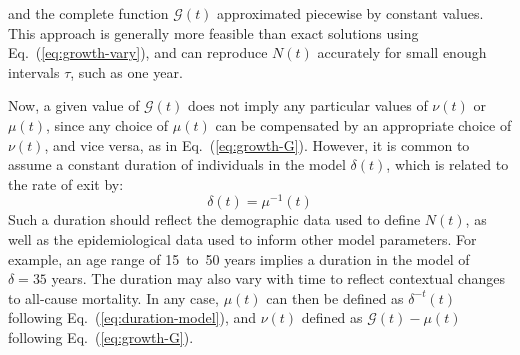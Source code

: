 and the complete function $\mathcal{G}(t)$ approximated piecewise by constant values.
This approach is generally more feasible than exact solutions using Eq.~(\ref{eq:growth-vary}),
and can reproduce $N(t)$ accurately for small enough intervals $\tau$,
such as one year.
\par
Now, a given value of $\mathcal{G}(t)$ does not imply any particular
values of $\nu(t)$ or $\mu(t)$,
since any choice of $\mu(t)$ can be compensated by an appropriate choice of $\nu(t)$,
and vice versa, as in Eq.~(\ref{eq:growth-G}).
However, it is common to assume a constant duration of individuals in the model $\delta(t)$,
which is related to the rate of exit by:
\begin{equation} \label{eq:duration-model}
\delta(t) = \mu^{-1}(t)
\end{equation}
Such a duration should reflect the demographic data used to define $N(t)$,
as well as the epidemiological data used to inform other model parameters.
For example, an age range of 15~to~50 years implies a duration in the model of $\delta = 35$ years.
The duration may also vary with time to reflect contextual changes to all-cause mortality.
In any case, $\mu(t)$ can then be defined as $\delta^{-t}(t)$
following Eq.~(\ref{eq:duration-model}),
and $\nu(t)$ defined as $\mathcal{G}(t) - \mu(t)$
following Eq.~(\ref{eq:growth-G}).
